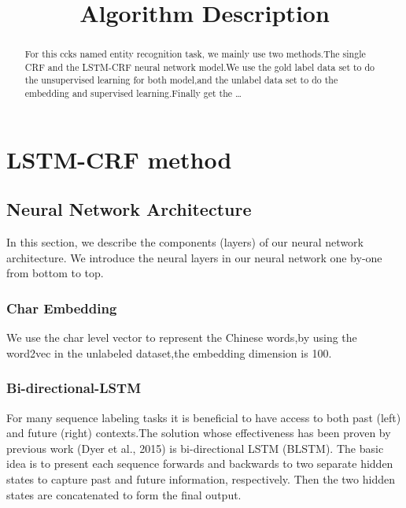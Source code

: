 \documentclass{llncs}
\begin{document}
	

\title{Algorithm Description}
%
%
\author{}

%

\maketitle              %

\begin{abstract}
For this ccks named entity recognition task, we mainly use two methods.The single CRF and the LSTM-CRF neural network model.We use the gold label data 
set to do the unsupervised learning for both model,and the unlabel data set to do the embedding and supervised learning.Finally get the  \dots
{}
\end{abstract}
%
\section{LSTM-CRF method}
\subsection{Neural Network Architecture}
In this section, we describe the components (layers) of our neural network architecture. We introduce the neural layers in our neural network one
by-one from bottom to top.
\subsubsection{Char Embedding}
We use the char level vector to represent the Chinese words,by using the word2vec in the unlabeled dataset,the embedding dimension is 100.
\subsubsection{Bi-directional-LSTM}
For many sequence labeling tasks it is beneficial to have access to both past (left) and future (right) contexts.The solution whose effectiveness has been proven by previous work (Dyer et al., 2015) is bi-directional LSTM
(BLSTM). The basic idea is to present each sequence forwards and backwards to two separate hidden states to capture past and future information, respectively. Then the two hidden states are concatenated to form the final output.
\end{document}
